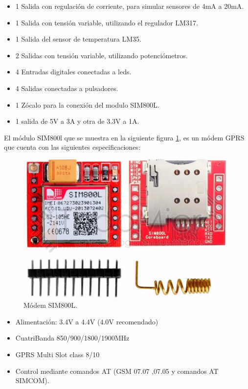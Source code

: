 \begin{itemize}
  \item 1 Salida con regulación de corriente, para simular sensores de 4mA a 20mA.
  \item 1 Salida con tensión variable, utilizando el regulador LM317.
  \item 1 Salida del sensor de temperatura LM35.
  \item 2 Salidas con tensión variable, utilizando potenciómetros. 
  \item 4 Entradas digitales conectadas a leds.
  \item 4 Salidas conectadas a pulsadores. 
  \item 1 Zócalo para la conexión del modulo SIM800L. 
  \item 1 salida de 5V a 3A y otra de 3.3V a 1A. 
\end{itemize}

El módulo SIM800l que se muestra en la siguiente figura \ref{fig:sim800l}, es un módem GPRS que cuenta con las siguientes especificaciones:

\begin{figure}[!htb]
  \centering
  \includegraphics[scale=0.2]{./Figures/sim800.png}
  \caption{Módem SIM800L.}
  \label{fig:sim800l}
\end{figure}

\begin{itemize}
  \item Alimentación: 3.4V a 4.4V (4.0V recomendado)
  \item  CuatriBanda 850/900/1800/1900MHz
  \item  GPRS Multi Slot class 8/10
  \item  Control mediante comandos AT (GSM 07.07 ,07.05 y comandos AT SIMCOM).
\end{itemize}


